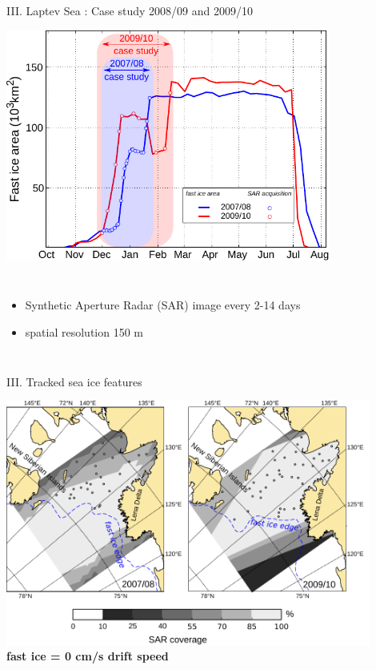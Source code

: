 \documentclass[8pt]{beamer}
\begin{document}
\setwatermark{\fontsize{125pt}{125pt}\selectfont{}}
\begin{frame}[fragile]{III. Laptev Sea : Case study 2008/09 and 2009/10}
	\begin{center}
		\includegraphics[width=0.8\textwidth]{./img/casestudy.pdf}
	\end{center}
	\begin{columns}
			\begin{itemize}
				\item Synthetic Aperture Radar (SAR) image every 2-14 days
				\item spatial resolution 150 m
			\end{itemize}
	\end{columns}
\end{frame}

\setwatermark{\fontsize{125pt}{125pt}\selectfont{}}


\begin{frame}[fragile]{III. Tracked sea ice features}

		\begin{center}
		\includegraphics[width=0.9\textwidth]{./img/trackpoints.pdf}\\
		\textbf{fast ice = 0 cm/s drift speed}
		\end{center}
\end{frame}
\end{document}
